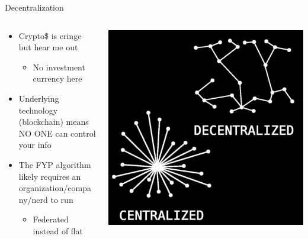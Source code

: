 \documentclass[aspectratio=169]{beamer}
\begin{document}
\begin{frame}{Decentralization}
\begin{columns}[T]
    \begin{column}[T]{0.5\textwidth}
        \begin{itemize}
            \item Crypto\$ is cringe but hear me out
            \begin{itemize}
                \item No investment currency here
            \end{itemize}
            \item Underlying technology (blockchain) means NO ONE can control your info
            \item The FYP algorithm likely requires an organization/company/nerd to run
            \begin{itemize}
                \item Federated instead of flat
            \end{itemize}
        \end{itemize}
    \end{column}
    \begin{column}{0.5\textwidth}
        \includegraphics[height=0.8\textheight]{imgs/power_to_people/decentralized.png}
    \end{column}
\end{columns}
\end{frame}
\end{document}
